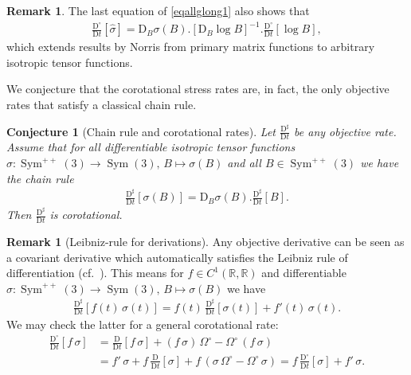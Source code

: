 \documentclass[10pt]{article}
\newcounter{theoremCounter}
\numberwithin{theoremCounter}{section}
\theoremstyle{plain}
\newtheorem{conjecture}[theoremCounter]{Conjecture}
\theoremstyle{definition}
\newtheorem{rem}[theoremCounter]{Remark}
\newcommand{\R}{\mathbb{R}}
\newcommand{\DD}{\mathrm{D}}
\DeclareMathOperator{\Sym}{Sym}
\numberwithin{equation}{section}
\begin{document}
%
\begin{rem}
The last equation of \eqref{eqallglong1} also shows that
	\begin{align}
	\frac{\DD^{\circ}}{\DD t}[\widehat \sigma] = \DD_B \sigma(B).[\DD_B \log B]^{-1}. \frac{\DD^{\circ}}{\DD t}[\log B],
	\end{align}
which extends results by Norris \cite[Lemma 2]{Norris2008} from primary matrix functions to arbitrary isotropic tensor functions.
\end{rem}
%
We conjecture that the corotational stress rates are, in fact, the only objective rates that satisfy a classical chain rule.
\begin{conjecture}[Chain rule and corotational rates]
Let $\frac{\DD^{\sharp}}{\DD t}$ be any objective rate. Assume that for all differentiable isotropic tensor functions $\sigma\colon \Sym^{++}(3) \to \Sym(3), \, B \mapsto \sigma(B)$ and all $B \in \Sym^{++}(3)$ we have the chain rule
	\begin{align}
	\frac{\DD^{\sharp}}{\DD t}[\sigma(B)] = \DD_B \sigma(B). \frac{\DD^{\sharp}}{\DD t}[B].
	\end{align}
Then $\frac{\DD^{\sharp}}{\DD t}$ is corotational.
\end{conjecture}
%
\begin{rem}[Leibniz-rule for derivations]
Any objective derivative can be seen as a covariant derivative \cite{kolev2024objective} which automatically satisfies the Leibniz rule of differentiation (cf.~\cite[p.~10]{kolev2024objective}). This means for $f \in C^1(\R, \R)$ and differentiable $\sigma\colon \Sym^{++}(3) \to \Sym(3), \, B \mapsto \sigma(B)$ we have
	\begin{align}
	\frac{\DD^{\sharp}}{\DD t}[f(t) \, \sigma(t)] = f(t) \, \frac{\DD^{\sharp}}{\DD t}[\sigma(t)] + f'(t) \, \sigma(t).
	\end{align}
We may check the latter for a general corotational rate:
	\begin{equation}
	\begin{alignedat}{2}
	\frac{\DD^{\circ}}{\DD t}[f \, \sigma] &= \frac{\DD}{\DD t}[f \, \sigma] + (f \, \sigma) \, \Omega^{\circ} - \Omega^{\circ} \, (f \, \sigma) \\
	&= f' \, \sigma + f \, \frac{\DD}{\DD t}[\sigma] + f \, (\sigma \, \Omega^{\circ} - \Omega^{\circ} \, \sigma) = f \, \frac{\DD^{\circ}}{\DD t}[\sigma] + f' \, \sigma.
	\end{alignedat}
	\end{equation}
\end{rem}
\end{document}
